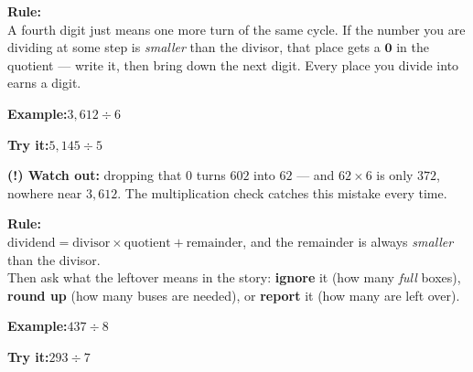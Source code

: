 \documentclass[12pt]{article}
\begin{document}
\begin{formulabox}\textbf{Rule:}\\[3pt]
A fourth digit just means one more turn of the same cycle. If the number you are
dividing at some step is \emph{smaller} than the divisor, that place gets a
$\mathbf{0}$ in the quotient --- write it, then bring down the next digit.
Every place you divide into earns a digit.
\end{formulabox}
\begin{examplebox}\textbf{Example:}\quad $3{,}612 \div 6$
\end{examplebox}
\begin{tryitbox}\textbf{Try it:}\quad $5{,}145 \div 5$\\[2pt]
\end{tryitbox}
\begin{watchoutbox}\textbf{(!) Watch out:} dropping that $0$ turns $602$ into
$62$ --- and $62 \times 6$ is only $372$, nowhere near $3{,}612$. The
multiplication check catches this mistake every time.
\end{watchoutbox}

\begin{formulabox}\textbf{Rule:}\\[3pt]
$\text{dividend} = \text{divisor} \times \text{quotient} + \text{remainder}$,
and the remainder is always \emph{smaller} than the divisor.\\[2pt]
Then ask what the leftover means in the story: \textbf{ignore} it (how many
\emph{full} boxes), \textbf{round up} (how many buses are needed), or
\textbf{report} it (how many are left over).
\end{formulabox}
\begin{examplebox}\textbf{Example:}\quad $437 \div 8$
\end{examplebox}
\begin{tryitbox}\textbf{Try it:}\quad $293 \div 7$\\[2pt]
\end{tryitbox}
\end{document}
